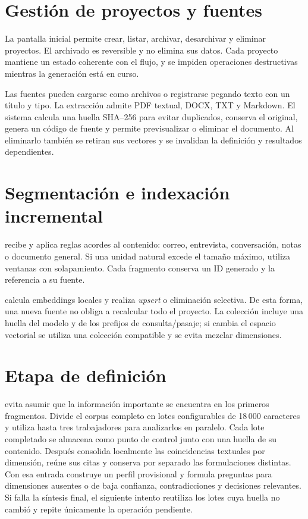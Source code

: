 \section{Gestión de proyectos y fuentes}

La pantalla inicial permite crear, listar, archivar, desarchivar y eliminar proyectos. El archivado es reversible y no elimina sus datos. Cada proyecto mantiene un estado coherente con el flujo, y se impiden operaciones destructivas mientras la generación está en curso.

Las fuentes pueden cargarse como archivos o registrarse pegando texto con un título y tipo. La extracción admite PDF textual, DOCX, TXT y Markdown. El sistema calcula una huella SHA--256 para evitar duplicados, conserva el original, genera un código de fuente y permite previsualizar o eliminar el documento. Al eliminarlo también se retiran sus vectores y se invalidan la definición y resultados dependientes.

\section{Segmentación e indexación incremental}

 recibe  y aplica reglas acordes al contenido: correo, entrevista, conversación, notas o documento general. Si una unidad natural excede el tamaño máximo, utiliza ventanas con solapamiento. Cada fragmento conserva un ID generado y la referencia a su fuente.

 calcula embeddings locales y realiza \emph{upsert} o eliminación selectiva. De esta forma, una nueva fuente no obliga a recalcular todo el proyecto. La colección incluye una huella del modelo y de los prefijos de consulta/pasaje; si cambia el espacio vectorial se utiliza una colección compatible y se evita mezclar dimensiones.

\section{Etapa de definición}

 evita asumir que la información importante se encuentra en los primeros fragmentos. Divide el corpus completo en lotes configurables de 18\,000 caracteres y utiliza hasta tres trabajadores para analizarlos en paralelo. Cada lote completado se almacena como punto de control junto con una huella de su contenido. Después consolida localmente las coincidencias textuales por dimensión, reúne sus citas y conserva por separado las formulaciones distintas. Con esa entrada construye un perfil provisional y formula preguntas para dimensiones ausentes o de baja confianza, contradicciones y decisiones relevantes. Si falla la síntesis final, el siguiente intento reutiliza los lotes cuya huella no cambió y repite únicamente la operación pendiente.

